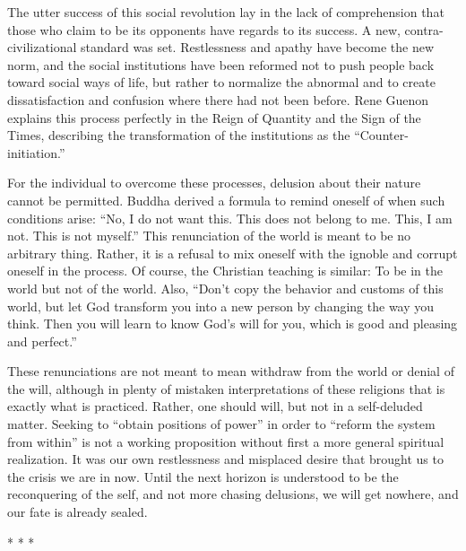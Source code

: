 The utter success of this social revolution lay in the lack of comprehension that those who claim to be its opponents have regards to its success. A new, contra-civilizational standard was set. Restlessness and apathy have become the new norm, and the social institutions have been reformed not to push people back toward social ways of life, but rather to normalize the abnormal and to create dissatisfaction and confusion where there had not been before. Rene Guenon explains this process perfectly in the Reign of Quantity and the Sign of the Times, describing the transformation of the institutions as the ``Counter-initiation.''

For the individual to overcome these processes, delusion about their nature cannot be permitted. Buddha derived a formula to remind oneself of when such conditions arise: ``No, I do not want this. This does not belong to me. This, I am not. This is not myself.'' This renunciation of the world is meant to be no arbitrary thing. Rather, it is a refusal to mix oneself with the ignoble and corrupt oneself in the process. Of course, the Christian teaching is similar: To be in the world but not of the world. Also, ``Don't copy the behavior and customs of this world, but let God transform you into a new person by changing the way you think. Then you will learn to know God's will for you, which is good and pleasing and perfect.''

These renunciations are not meant to mean withdraw from the world or denial of the will, although in plenty of mistaken interpretations of these religions that is exactly what is practiced. Rather, one should will, but not in a self-deluded matter. Seeking to ``obtain positions of power'' in order to ``reform the system from within'' is not a working proposition without first a more general spiritual realization. It was our own restlessness and misplaced desire that brought us to the crisis we are in now. Until the next horizon is understood to be the reconquering of the self, and not more chasing delusions, we will get nowhere, and our fate is already sealed.



\begin{center}* * *\end{center}

